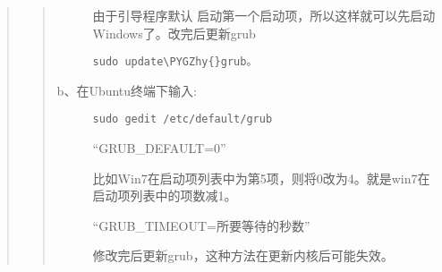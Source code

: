 \documentclass[letterpaper,10pt,english]{sphinxmanual}
\def\PYGZhy{\char`\-}
\begin{document}
\begin{quote}
\begin{quote}
\begin{description}
由于引导程序默认 启动第一个启动项，所以这样就可以先启动Windows了。改完后更新grub

\begin{Verbatim}[commandchars=\\\{\}]
sudo update\PYGZhy{}grub。
\end{Verbatim}

\item[{b、在Ubuntu终端下输入:}] \leavevmode
\begin{Verbatim}[commandchars=\\\{\}]
sudo gedit /etc/default/grub
\end{Verbatim}

“GRUB\_DEFAULT=0”

比如Win7在启动项列表中为第5项，则将0改为4。就是win7在启动项列表中的项数减1。

“GRUB\_TIMEOUT=所要等待的秒数”

修改完后更新grub，这种方法在更新内核后可能失效。

\end{description}
\end{quote}
\end{quote}
\end{document}
